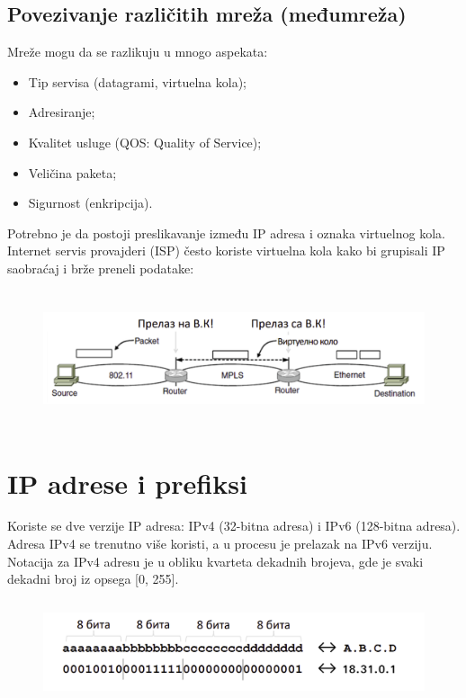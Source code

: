 \documentclass[a4paper]{article}
\begin{document}
    \subsection{Povezivanje različitih mreža (međumreža)}
        \noindent Mreže mogu da se razlikuju u mnogo aspekata:
        \begin{itemize}
            \item Tip servisa (datagrami, virtuelna kola);
            \item Adresiranje;
            \item Kvalitet usluge (QOS: Quality of Service);
            \item Veličina paketa;
            \item Sigurnost (enkripcija).
        \end{itemize}
        Potrebno je da postoji preslikavanje između IP adresa i oznaka virtuelnog kola. 
        Internet servis provajderi (ISP) često koriste virtuelna kola kako bi grupisali IP
        saobraćaj i brže preneli podatake:
        \begin{figure}[H]
            \begin{center}
                \includegraphics[width=120mm,height=40mm]{Slike/grupisanje_paketa.png}
            \end{center}
        \end{figure}

\section{IP adrese i prefiksi}
    Koriste se dve verzije IP adresa: IPv4 (32-bitna adresa) i IPv6 (128-bitna adresa). Adresa
    IPv4 se trenutno više koristi, a u procesu je prelazak na IPv6 verziju. Notacija za IPv4 adresu
    je u obliku kvarteta dekadnih brojeva, gde je svaki dekadni broj iz opsega [0, 255].  
    \begin{figure}[H]
        \begin{center}
            \includegraphics[width=120mm,height=30mm]{Slike/ipv4_notacija.png}
        \end{center}
    \end{figure}
\end{document}
